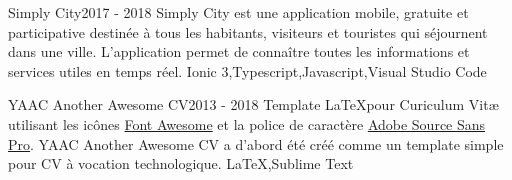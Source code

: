 


\begin{projects}
	\project
	{Simply City}{2017 - 2018}
	{  }
	{Simply City est une application mobile, gratuite et participative destinée à tous les habitants, visiteurs et touristes qui séjournent dans une ville. L’application permet de connaître toutes les informations et services utiles en temps réel.}
	{Ionic 3,Typescript,Javascript,Visual Studio Code}
				
	\project
	{YAAC Another Awesome CV}{2013 - 2018}
	{ }
	{Template \LaTeX pour Curiculum Vitæ utilisant les icônes \href{https://fontawesome.com}{Font Awesome} et la police de caractère \href{https://fonts.google.com/specimen/Source+Sans+Pro}{Adobe Source Sans Pro}. YAAC Another Awesome CV a d'abord été créé comme un template simple pour CV à vocation technologique.}
	{\LaTeX,Sublime Text}

\end{projects}